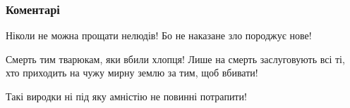  
 
 
 
 
\subsubsection{Коментарі}
\label{sec:26_07_2021.fb.gejman_natalia.1.rusmir.cmt}

\begin{itemize}
 
Ніколи не можна прощати нелюдів! Бо не наказане зло породжує нове!

 
Смерть тим тварюкам, яки вбили хлопця! Лише на смерть заслуговують всі ті, хто приходить на чужу мирну землю за тим, щоб вбивати!

 
Такі виродки ні під яку амністію не повинні потрапити!

 
🖤

 

\end{itemize}
